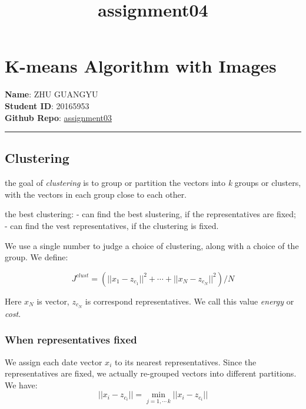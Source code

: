 \documentclass[11pt]{article}
\title{assignment04}
\begin{document}
    
    
    \maketitle
    
    

    
    \section{K-means Algorithm with
Images}\label{k-means-algorithm-with-images}

\textbf{Name}: ZHU GUANGYU\\
\textbf{Student ID}: 20165953\\
\textbf{Github Repo}: \href{}{assignment03}

\begin{center}\rule{0.5\linewidth}{\linethickness}\end{center}

\subsection{Clustering}\label{clustering}

the goal of \emph{clustering} is to group or partition the vectors into
\emph{k} groups or clusters, with the vectors in each group close to
each other.

the best clustering: - can find the best slustering, if the
representatives are fixed; - can find the vest representatives, if the
clustering is fixed.

We use a single number to judge a choice of clustering, along with a
choice of the group. We define:

\[
J^{clust}=(||x_{1}-z_{c_{1}}||^{2}+ \cdots +||x_{N}-z_{c_{N}}||^{2})/N
\]

Here \(x_{N}\) is vector, \(z_{c_{N}}\) is correspond representatives.
We call this value \emph{energy} or \emph{cost}.

\subsubsection{When representatives
fixed}\label{when-representatives-fixed}

We assign each date vector \(x_{i}\) to its nearest representatives.
Since the representatives are fixed, we actually re-grouped vectors into
different partitions. We have:
\[ ||x_{i}-z_{c_{i}}|| = \min_{j=1,\cdots\,k}||x_{i}-z_{c_{i}}|| \]
\end{document}
